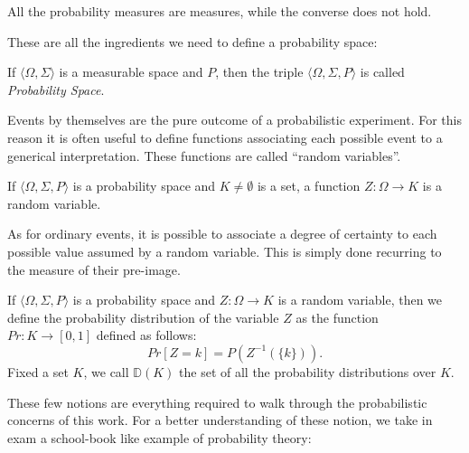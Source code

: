 \begin{remark}
  All the probability measures are measures, while the converse does not hold.
\end{remark}

These are all the ingredients we need to define a probability space:

\begin{defn}
  If $\langle \Omega, \Sigma\rangle$ is a measurable space and $P$,
  then the triple $\langle \Omega, \Sigma, P\rangle$ is called
  \emph{Probability Space}.
\end{defn}

Events by themselves are the pure outcome of a probabilistic
experiment. For this reason it is often useful to
define functions associating each possible
event to a generical interpretation. These functions are called ``random variables''.

\begin{defn}
  If $\langle \Omega, \Sigma, P\rangle$ is a probability space and
  $K\neq \emptyset$ is a set, a function $Z: \Omega \longrightarrow K$
  is a random variable.
\end{defn}

As for ordinary events, it is possible to associate a degree of
certainty to each possible value assumed by a random variable. This
is simply done recurring to the measure of their pre-image.

\begin{defn}
  If $\langle \Omega, \Sigma, P\rangle$ is a probability space and
  $Z: \Omega \longrightarrow K$ is a random variable,
  then we define the probability distribution of the variable $Z$ as the function $\mathit{Pr}: K \longrightarrow [0,1]$ defined as follows:
  $$
  \mathit{Pr}[Z = k] = P(Z^{-1}(\{k\})).
  $$
  Fixed a set $K$, we call $\mathbb D(K)$ the set of all the probability distributions over $K$.
\end{defn}

These few notions are everything required to walk through the
probabilistic concerns of this work. For a better understanding of
these notion, we take in exam a school-book like example of
probability theory:

